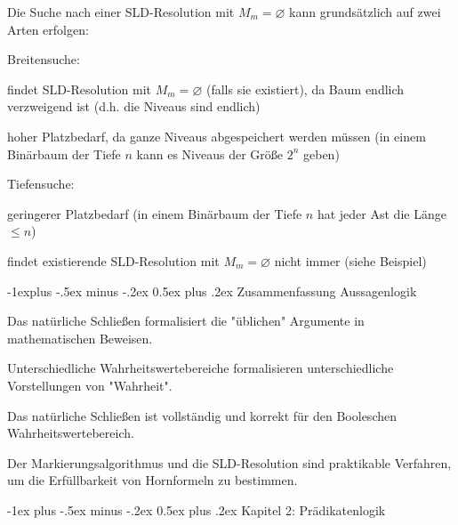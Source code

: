 \documentclass[a4paper]{article}
\makeatletter
\renewcommand{\section}{\@startsection{section}{1}{0mm}%
                {-1ex plus -.5ex minus -.2ex}%
                {0.5ex plus .2ex}%
                {\normalfont\large\bfseries}}
\renewcommand{\subsection}{\@startsection{subsection}{2}{0mm}%
                {-1explus -.5ex minus -.2ex}%
                {0.5ex plus .2ex}%
                {\normalfont\normalsize\bfseries}}
\makeatother
\begin{document}
\begin{multicols}{3}
  Die Suche nach einer SLD-Resolution mit $M_m=\varnothing$ kann grundsätzlich auf zwei Arten erfolgen:
  \begin{itemize*}
    \item Breitensuche:
    \begin{itemize*}
      \item findet SLD-Resolution mit $M_m=\varnothing$ (falls sie existiert), da Baum endlich verzweigend ist (d.h. die Niveaus sind endlich)
      \item hoher Platzbedarf, da ganze Niveaus abgespeichert werden müssen (in einem Binärbaum der Tiefe $n$ kann es Niveaus der Größe $2^n$ geben)
    \end{itemize*}
    \item Tiefensuche:
    \begin{itemize*}
      \item geringerer Platzbedarf (in einem Binärbaum der Tiefe $n$ hat jeder Ast die Länge $\leq n$)
      \item findet existierende SLD-Resolution mit $M_m=\varnothing$ nicht immer (siehe Beispiel)
    \end{itemize*}
  \end{itemize*}

  \subsection{Zusammenfassung Aussagenlogik}
  \begin{itemize*}
    \item Das natürliche Schließen formalisiert die "üblichen" Argumente in mathematischen Beweisen.
    \item Unterschiedliche Wahrheitswertebereiche formalisieren unterschiedliche Vorstellungen von "Wahrheit".
    \item Das natürliche Schließen ist vollständig und korrekt für den Booleschen Wahrheitswertebereich.
    \item Der Markierungsalgorithmus und die SLD-Resolution sind praktikable Verfahren, um die Erfüllbarkeit von Hornformeln zu bestimmen.
  \end{itemize*}

  \section{Kapitel 2: Prädikatenlogik}


\end{multicols}
\end{document}
